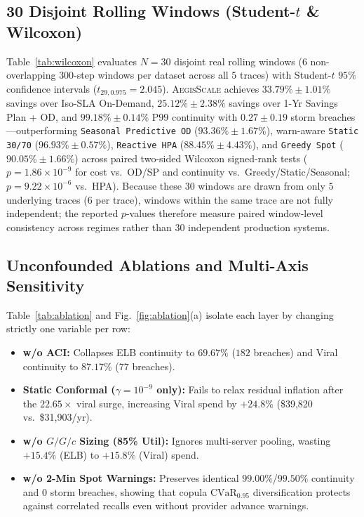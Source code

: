 \documentclass[journal]{IEEEtran}
\begin{document}
\subsection{30 Disjoint Rolling Windows (Student-$t$ \& Wilcoxon)}
Table~\ref{tab:wilcoxon} evaluates $N=30$ disjoint real rolling windows ($6$ non-overlapping $300$-step windows per dataset across all $5$ traces) with Student-$t$ $95\%$ confidence intervals ($t_{29,0.975} = 2.045$). \textsc{AegisScale} achieves $33.79\% \pm 1.01\%$ savings over Iso-SLA On-Demand, $25.12\% \pm 2.38\%$ savings over 1-Yr Savings Plan + OD, and $99.18\% \pm 0.14\%$ $\mathrm{P99}$ continuity with $0.27 \pm 0.19$ storm breaches---outperforming \texttt{Seasonal Predictive OD} ($93.36\% \pm 1.67\%$), warn-aware \texttt{Static 30/70} ($96.93\% \pm 0.57\%$), \texttt{Reactive HPA} ($88.45\% \pm 4.43\%$), and \texttt{Greedy Spot} ($90.05\% \pm 1.66\%$) across paired two-sided Wilcoxon signed-rank tests ($p = 1.86 \times 10^{-9}$ for cost vs.\ OD/SP and continuity vs.\ Greedy/Static/Seasonal; $p = 9.22 \times 10^{-6}$ vs.\ HPA). Because these $30$ windows are drawn from only $5$ underlying traces ($6$ per trace), windows within the same trace are not fully independent; the reported $p$-values therefore measure paired window-level consistency across regimes rather than $30$ independent production systems.

\subsection{Unconfounded Ablations and Multi-Axis Sensitivity}
Table~\ref{tab:ablation} and Fig.~\ref{fig:ablation}(a) isolate each layer by changing strictly one variable per row:
\begin{itemize}
    \item \textbf{w/o ACI:} Collapses ELB continuity to $69.67\%$ ($182$ breaches) and Viral continuity to $87.17\%$ ($77$ breaches).
    \item \textbf{Static Conformal ($\gamma = 10^{-9}$ only):} Fails to relax residual inflation after the $22.65\times$ viral surge, increasing Viral spend by $+24.8\%$ (\$39,820 vs.\ \$31,903/yr).
    \item \textbf{w/o $G/G/c$ Sizing (85\% Util):} Ignores multi-server pooling, wasting $+15.4\%$ (ELB) to $+15.8\%$ (Viral) spend.
    \item \textbf{w/o 2-Min Spot Warnings:} Preserves identical $99.00\%$/$99.50\%$ continuity and $0$ storm breaches, showing that copula $\mathrm{CVaR}_{0.95}$ diversification protects against correlated recalls even without provider advance warnings.
\end{itemize}
\end{document}
